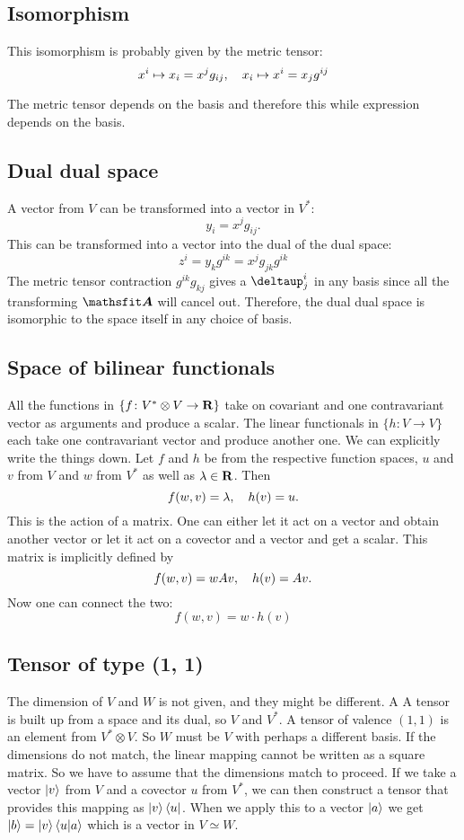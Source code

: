 \documentclass[11pt, english, fleqn, DIV=15, headinclude, BCOR=1cm]{scrartcl}
\begin{document}
\subsection{Isomorphism}

This isomorphism is probably given by the metric tensor:
\[
    x^i \mapsto x_i = x^j g_{ij}
    ,\quad
    x_i \mapsto x^i = x_j g^{ij}
\]

The metric tensor depends on the basis and therefore this while expression
depends on the basis.

\subsection{Dual dual space}

A vector from $V$ can be transformed into a vector in $V^*$:
\[
    y_i = x^j g_{ij}.
\]
This can be transformed into a vector into the dual of the dual space:
\[
    z^i = y_k g^{ik} = x^j g_{jk} g^{ik}
\]
The metric tensor contraction $g^{ik} g_{kj}$ gives a $\deltaup^i_j$ in any
basis since all the transforming $\tens A$ will cancel out. Therefore, the dual
dual space is isomorphic to the space itself in any choice of basis.

\subsection{Space of bilinear functionals}

All the functions in $\{f \colon V^* \otimes V \to \mathbf R\}$ take on covariant and
one contravariant vector as arguments and produce a scalar. The linear
functionals in $\{h \colon V \to V\}$ each take one contravariant vector and
produce another one. We can explicitly write the things down. Let $f$ and $h$
be from the respective function spaces, $u$ and $v$ from $V$ and $w$ from
$V^*$ as well as $\lambda \in \mathbf R$. Then
\[
    f(w, v) = \lambda
    ,\quad
    h(v) = u.
\]
This is the action of a matrix. One can either let it act on a vector and
obtain another vector or let it act on a covector and a vector and get a
scalar. This matrix is implicitly defined by
\[
    f(w, v) = w A v
    ,\quad
    h(v) = A v.
\]
Now one can connect the two:
\[
    f(w, v) = w \cdot h(v)
\]

\subsection{Tensor of type (1, 1)}

The dimension of $V$ and $W$ is not given, and they might be different. A A
tensor is built up from a space and its dual, so $V$ and $V^*$. A tensor of
valence $(1, 1)$ is an element from $V^* \otimes V$. So $W$ must be $V$ with
perhaps a different basis. If the dimensions do not match, the linear mapping
cannot be written as a square matrix. So we have to assume that the dimensions
match to proceed. If we take a vector $\ket v$ from $V$ and a covector $u$ from
$V^*$, we can then construct a tensor that provides this mapping as $\ket v
\bra u$. When we apply this to a vector $\ket a$ we get $\ket b = \ket v
\braket{u | a}$ which is a vector in $V \simeq W$.
\end{document}
